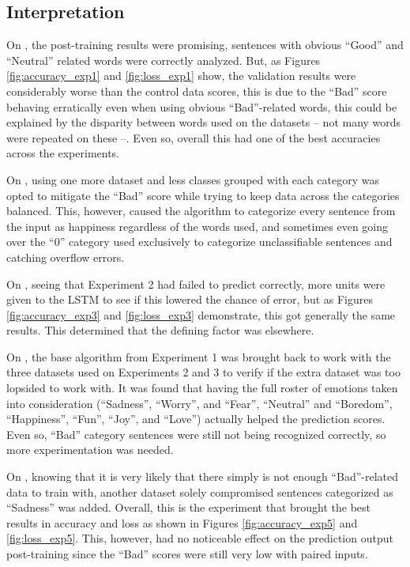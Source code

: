 \subsection{Interpretation}
On , the post-training results were promising, sentences with obvious ``Good'' and ``Neutral'' related words were correctly analyzed. But, as Figures \ref{fig:accuracy_exp1} and \ref{fig:loss_exp1} show, the validation results were considerably worse than the control data scores, this is due to the ``Bad'' score behaving erratically even when using obvious ``Bad''-related words, this could be explained by the disparity between words used on the datasets -- not many words were repeated on these --. Even so, overall this had one of the best accuracies across the experiments.

On , using one more dataset and less classes grouped with each category was opted to mitigate the ``Bad'' score while trying to keep data across the categories balanced. This, however, caused the algorithm to categorize every sentence from the input as happiness regardless of the words used, and sometimes even going over the ``0'' category used exclusively to categorize unclassifiable sentences and catching overflow errors.

On , seeing that Experiment 2 had failed to predict correctly, more units were given to the LSTM to see if this lowered the chance of error, but as Figures \ref{fig:accuracy_exp3} and \ref{fig:loss_exp3} demonstrate, this got generally the same results. This determined that the defining factor was elsewhere.

On , the base algorithm from Experiment 1 was brought back to work with the three datasets used on Experiments 2 and 3 to verify if the extra dataset was too lopsided to work with. It was found that having the full roster of emotions taken into consideration (``Sadness'', ``Worry'', and ``Fear'', ``Neutral'' and ``Boredom'', ``Happiness'', ``Fun'', ``Joy'', and ``Love'') actually helped the prediction scores. Even so, ``Bad'' category sentences were still not being recognized correctly, so more experimentation was needed.

On , knowing that it is very likely that there simply is not enough ``Bad''-related data to train with, another dataset solely compromised sentences categorized as ``Sadness'' was added. Overall, this is the experiment that brought the best results in accuracy and loss as shown in Figures \ref{fig:accuracy_exp5} and \ref{fig:loss_exp5}. This, however, had no noticeable effect on the prediction output post-training since the ``Bad'' scores were still very low with paired inputs.

